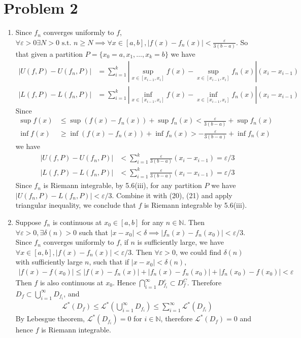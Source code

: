 \documentclass[a4paper]{report}
\def\ve{\varepsilon}
\newcommand{\mcal}[1]{\mathcal{#1}}
\begin{document}
\section*{Problem 2}

\begin{enumerate}[label= (\alph*)]

\item 
Since $f_n$ converges uniformly to $f$, $\forall \ve > 0 \exists N > 0 \text{ s.t. } n \ge
N \implies \forall x \in [a,b], |f(x) - f_n(x)| < \frac{\ve}{3(b-a)}$. So that given a 
partition $P = \{x_0=a, x_1, \ldots, x_k = b\}$ we have 
\begin{align}
    |U(f, P) - U(f_n, P)| &= \sum_{i=1}^k \left|\sup_{x\in [x_{i-1}, x_i]} f(x)-\sup_{x\in 
        [x_{i-1}, x_i]} f_n(x) \right| (x_i - x_{i-1}) \\
    |L(f, P) - L(f_n, P)| &= \sum_{i=1}^k \left|\inf_{x\in [x_{i-1}, x_i]} f(x)-\inf_{x\in 
        [x_{i-1}, x_i]} f_n(x) \right| (x_i - x_{i-1})
\end{align}
Since 
\begin{align}
    \sup f(x) &\le \sup (f(x) - f_n(x)) + \sup f_n(x) < \frac{\ve}{3(b-a)}+\sup f_n(x) \\
    \inf f(x) &\ge \inf (f(x) - f_n(x)) + \inf f_n(x) > -\frac{\ve}{3(b-a)}+\inf f_n(x)
\end{align}
we have 
\begin{align}
    |U(f, P) - U(f_n, P)| &< \sum_{i=1}^k \frac{\ve}{3(b-a)} (x_i - x_{i-1}) = \ve / 3 \\
    |L(f, P) - L(f_n, P)| &< \sum_{i=1}^k \frac{\ve}{3(b-a)} (x_i - x_{i-1}) = \ve / 3
\end{align}
Since $f_n$ is Riemann integrable, by 5.6(iii), for any partition $P$ we have 
$|U(f_n, P) - L(f_n, P)| < \ve / 3$. Combine it with (20), (21) and apply triangular 
inequality, we conclude that $f$ is Riemann integrable by 5.6(iii).

\item

Suppose $f_n$ is continuous at $x_0 \in [a, b]$ for any $n \in \mathbb{N}$. Then $\forall 
\ve > 0, \exists \delta(n) > 0$ such that $|x - x_0| < \delta \implies |f_n(x) - f_n(x_0)|
< \ve / 3$. Since $f_n$ converges uniformly to $f$, if $n$ is sufficiently large,
we have $\forall x \in [a,b], |f(x) - f_n(x)| < \ve / 3$. Then $\forall \ve > 0$, we could 
find $\delta(n)$ with sufficiently large $n$, such that if $|x - x_0| < \delta(n)$, 
\begin{align}
    |f(x)-f(x_0)| \le |f(x) - f_n(x)| + |f_n(x) - f_n(x_0)| + |f_n(x_0) - f(x_0)| < \ve
\end{align}
Then $f$ is also continuous at $x_0$. Hence $\bigcap_{i=1}^\infty D_{f_i}^c \subset D_f^C$.
Therefore $D_f \subset \bigcup_{i=1}^\infty D_{f_i}$, and 
\begin{align}
    \mcal{L}^*(D_f) \le \mcal{L}^*\left(\bigcup_{i=1}^\infty D_{f_i}\right) \le 
    \sum_{i=1}^\infty \mcal{L}^* ({D_{f_i}})
\end{align}
By Lebesgue theorem, $\mcal{L}^* ({D_{f_i}}) = 0$ for $i \in \mathbb{N}$, therefore 
$\mcal{L}^* (D_f) = 0$ and hence $f$ is Riemann integrable.

\end{enumerate}
\end{document}
